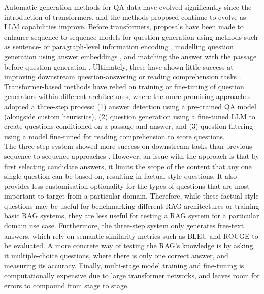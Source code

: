 Automatic generation methods for QA data have evolved significantly since the introduction of transformers, and the methods proposed continue to evolve as LLM capabilities improve. Before transformers, proposals have been made to enhance sequence-to-sequence models for question generation using methods such as sentence- or paragraph-level information encoding \cite{du2017learning}, modelling question generation using answer embeddings \cite{sun2018answer}, and matching the answer with the passage before question generation \cite{song2018leveraging}. Ultimately, these have shown little success at improving downstream question-answering or reading comprehension tasks \cite{shakeri2020end}. Transformer-based methods have relied on training or fine-tuning of question generators within different architectures, where the more promising approaches \cite{alberti2019synthetic, puri2020training, liu2020asking, bartolo2021improving} adopted a three-step process: (1) answer detection using a pre-trained QA model (alongside custom heuristics), (2) question generation using a fine-tuned LLM to create questions conditioned on a passage and answer, and (3) question filtering using a model fine-tuned for reading comprehension to score questions. \\

The three-step system showed more success on downstream tasks than previous sequence-to-sequence approaches \cite{shakeri2020end}. However, an issue with the approach is that by first selecting candidate answers, it limits the scope of the content that any one single question can be based on, resulting in factual-style questions. It also provides less customisation optionality for the types of questions that are most important to target from a particular domain. Therefore, while these factual-style questions may be useful for benchmarking different RAG architectures or training basic RAG systems, they are less useful for testing a RAG system for a particular domain use case. Furthermore, the three-step system only generates free-text answers, which rely on semantic similarity metrics such as BLEU and ROUGE to be evaluated. A more concrete way of testing the RAG's knowledge is by asking it multiple-choice questions, where there is only one correct answer, and measuring its accuracy. Finally, multi-stage model training and fine-tuning is computationally expensive due to large transformer networks, and leaves room for errors to compound from stage to stage. \\


